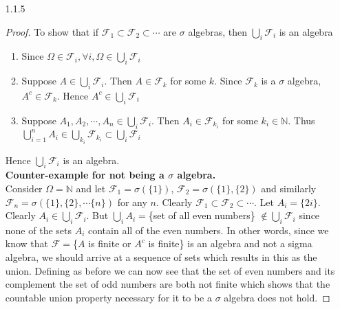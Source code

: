 \documentclass[a4paper,english,10pt]{article}
\begin{document}
\begin{enumerate}
\item[1.1.5]
\begin{proof}
To show that if $\mathcal{F}_1 \subset \mathcal{F}_2 \subset \cdots$ are $\sigma$ algebras, then $\bigcup_i\mathcal{F}_i$ is an algebra
\begin{enumerate}
\item Since $\Omega \in \mathcal{F}_i, \forall i, \Omega \in \bigcup_i \mathcal{F}_i$  
\item Suppose $A \in \bigcup_i\mathcal{F}_i$. Then $A\in \mathcal{F}_k$ for some $k$. Since $\mathcal{F}_k$ is a $\sigma$ algebra, $A^c \in \mathcal{F}_k$. Hence $A^c \in \bigcup_i\mathcal{F}_i$
\item Suppose $A_1,A_2,\cdots,A_n \in \bigcup_i\mathcal{F}_i$. Then $A_i \in \mathcal{F}_{k_i}$ for some $k_i \in \mathbb{N}$. Thus $\bigcup_{i=1}^n A_i \in \bigcup_{k_i}\mathcal{F}_{k_i} \subset \bigcup_i \mathcal{F}_i$
\end{enumerate}
Hence $\bigcup_i\mathcal{F}_i$ is an algebra.\\
\textbf{Counter-example for not being a $\sigma$ algebra.}\\
Consider $\Omega=\mathbb{N}$ and let $\mathcal{F}_1=\sigma(\{1\})$, $\mathcal{F}_2=\sigma(\{1\},\{2\})$ and similarly $\mathcal{F}_n=\sigma(\{1\},\{2\},\cdots \{n\})$ for any $n$. Clearly $\mathcal{F}_1 \subset \mathcal{F}_2 \subset \cdots$. Let $A_i=\{2i\}$. Clearly $A_i \in \bigcup_i\mathcal{F}_i$. But $\bigcup_iA_i=$\{set of all even numbers\} $\notin \bigcup_i\mathcal{F}_i$ since none of the sets $A_i$ contain all of the even numbers. In other words, since we know that $\mathcal{F}=$\{$A$ is finite or $A^c$ is finite\} is an algebra and not a sigma algebra, we should arrive at a sequence of sets which results in this as the union. Defining as before we can now see that the set of even numbers and its complement the set of odd numbers are both not finite which shows that the countable union property necessary for it to be a $\sigma$ algebra does not hold. 
\end{proof}


\end{enumerate}
\end{document}
